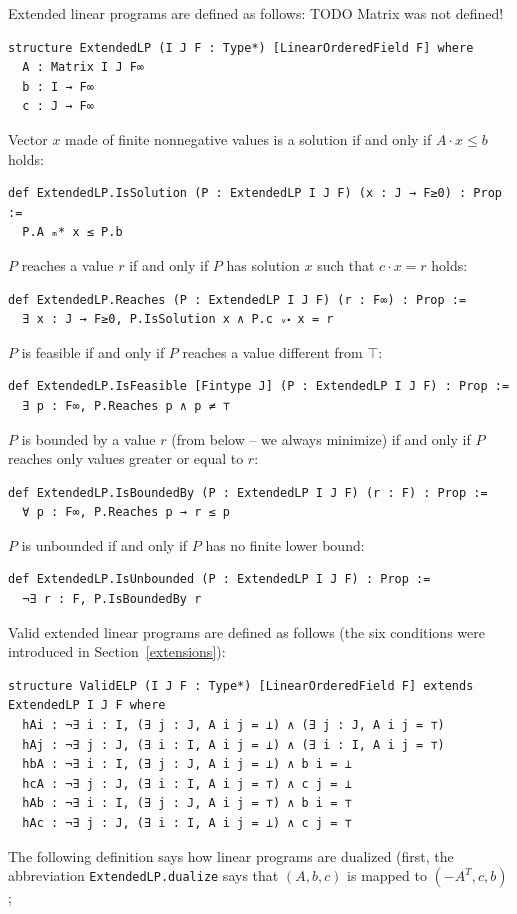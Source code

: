 \documentclass[]{article}
\renewcommand{\.}{\hskip .75pt}
\newcommand{\sekt}[1]{Section~\ref{#1}}
\let\*=\cdot
\begin{document}
Extended linear programs are defined as follows: {\color{blue} TODO Matrix was not defined!}
\begin{lstlisting}
structure ExtendedLP (I J F : Type*) [LinearOrderedField F] where
  A : Matrix I J F∞
  b : I → F∞
  c : J → F∞
\end{lstlisting}
Vector $x$ made of finite nonnegative values is a solution if and only if $A \* x \le b$
holds:
\begin{lstlisting}
def ExtendedLP.IsSolution (P : ExtendedLP I J F) (x : J → F≥0) : Prop :=
  P.A ₘ* x ≤ P.b
\end{lstlisting}
$P$ reaches a value $r$ if and only if $P$ has solution $x$ such that $c \* x = r$ holds:
\begin{lstlisting}
def ExtendedLP.Reaches (P : ExtendedLP I J F) (r : F∞) : Prop :=
  ∃ x : J → F≥0, P.IsSolution x ∧ P.c ᵥ⬝ x = r
\end{lstlisting}
$P$ is feasible if and only if $P$ reaches a value different from $\top$:
\begin{lstlisting}
def ExtendedLP.IsFeasible [Fintype J] (P : ExtendedLP I J F) : Prop :=
  ∃ p : F∞, P.Reaches p ∧ p ≠ ⊤
\end{lstlisting}
$P$ is bounded by a value $r$ (from below -- we always minimize) if and only if
$P$ reaches only values greater or equal to $r$:
\begin{lstlisting}
def ExtendedLP.IsBoundedBy (P : ExtendedLP I J F) (r : F) : Prop :=
  ∀ p : F∞, P.Reaches p → r ≤ p
\end{lstlisting}
$P$ is unbounded if and only if $P$ has no finite lower bound:
\begin{lstlisting}
def ExtendedLP.IsUnbounded (P : ExtendedLP I J F) : Prop :=
  ¬∃ r : F, P.IsBoundedBy r
\end{lstlisting}
Valid extended linear programs are defined as follows (the six conditions were
introduced in \sekt{extensions}):
\begin{lstlisting}
structure ValidELP (I J F : Type*) [LinearOrderedField F] extends ExtendedLP I J F where
  hAi : ¬∃ i : I, (∃ j : J, A i j = ⊥) ∧ (∃ j : J, A i j = ⊤)
  hAj : ¬∃ j : J, (∃ i : I, A i j = ⊥) ∧ (∃ i : I, A i j = ⊤)
  hbA : ¬∃ i : I, (∃ j : J, A i j = ⊥) ∧ b i = ⊥
  hcA : ¬∃ j : J, (∃ i : I, A i j = ⊤) ∧ c j = ⊥
  hAb : ¬∃ i : I, (∃ j : J, A i j = ⊤) ∧ b i = ⊤
  hAc : ¬∃ j : J, (∃ i : I, A i j = ⊥) ∧ c j = ⊤
\end{lstlisting}
The following definition says how linear programs are dualized (first, the abbreviation
\texttt{ExtendedLP.dualize} says that $(A, b, c)$ is mapped to $(-A^T, c, b)$;
\end{document}
